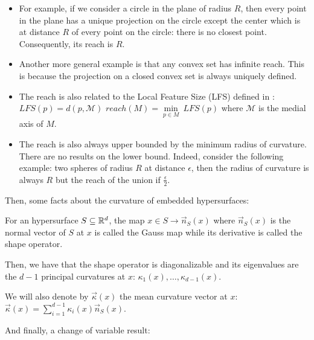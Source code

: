 \begin{itemize}
    \item For example, if we consider a circle in the plane of radius $ R $,
        then every point in the plane has a unique projection on the circle
        except the center which is at distance $ R $ of every point on the
        circle: there is no closest point.  Consequently, its reach is $ R $.

    \item Another more general example is that any convex set has infinite
        reach. This is because the projection on a closed convex set is always
        uniquely defined.

    \item The reach is also related to the Local Feature Size (LFS) defined in
        \cite{amenta1999surface}: $ LFS(p) = d(p, \mathcal{M}) $ $ reach(M) =
        \min\limits_{p \in M}~LFS(p) $ where $ \mathcal{M}  $ is the medial axis
        of $ M $.

    \item The reach is also always upper bounded by the minimum radius of
        curvature. There are no results on the lower bound. Indeed, consider the
        following example: two spheres of radius $ R $ at distance $ \epsilon $,
        then the radius of curvature is always $ R $ but the reach of the union
        if $ \frac{\epsilon}{2} $.
\end{itemize}

Then, some facts about the curvature of embedded hypersurfaces:

\begin{proposition}
    For an hypersurface $ S \subseteq \mathbb{R}^d $, the map $ x \in S \rightarrow
    \vec{n}_S(x) $ where $ \vec{n}_S(x) $ is the normal vector of $ S $ at $ x $ is
    called the Gauss map while its derivative is called the shape operator.

    Then, we have that the shape operator is diagonalizable and its eigenvalues
    are the $ d-1 $ principal curvatures at $ x $: $ \kappa_1(x), \ldots,
    \kappa_{d-1}(x) $.

    We will also denote by $ \vec{\kappa}(x) $ the mean curvature vector at $ x
    $: $ \vec{\kappa}(x) = \sum_{i=1}^{d-1} \kappa_i(x) \vec{n}_S(x) $.
    \label{prop:curvatures-surface}
\end{proposition}

And finally, a change of variable result:


